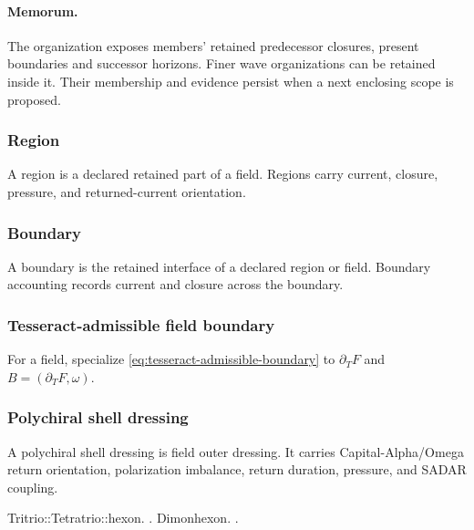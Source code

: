 \paragraph{Memorum.}
\label{subsec:field-memorum}
The organization exposes members' retained predecessor closures, present
boundaries and successor horizons. Finer wave organizations can be retained
inside it. Their membership and evidence persist when a next enclosing scope
is proposed.
\subsubsection{Region}
\label{subsec:field-region}
\begin{definition}[Region]
A region is a declared retained part of a field. Regions carry current, closure, pressure, and returned-current orientation.
\end{definition}

\subsubsection{Boundary}
\label{subsec:field-boundary}
\begin{definition}[Boundary]
A boundary is the retained interface of a declared region or field. Boundary accounting records current and closure across the boundary.
\end{definition}

\subsubsection{Tesseract-admissible field boundary}
\label{subsec:tesseract-admissible-boundary}
For a field, specialize \eqref{eq:tesseract-admissible-boundary} to
\(\partial_TF\) and \(B=(\partial_TF,\omega)\).

\subsubsection{Polychiral shell dressing}
\label{subsec:polychiral-shell-dressing}
\begin{definition}
A polychiral shell dressing is field outer dressing. It carries Capital-Alpha/Omega return orientation, polarization imbalance, return duration, pressure, and SADAR coupling.
\end{definition}

Tritrio::Tetratrio::hexon. . Dimonhexon. .

